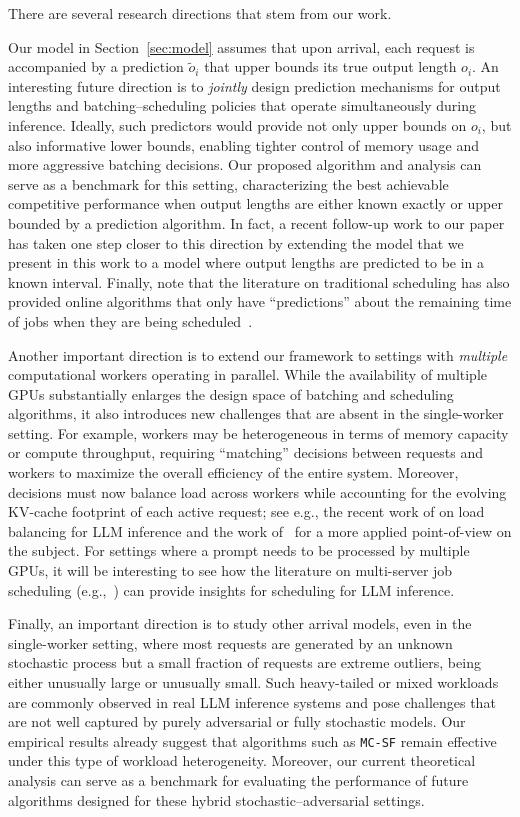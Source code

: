 \documentclass[11pt, a4paper]{article}
\theoremstyle{plain}
\theoremstyle{definition}
\theoremstyle{remark}
\newcommand{\mcsdf}{\texttt{MC-SF}}
\begin{document}
There are several research directions that stem from our work. 

{Our model in Section~\ref{sec:model} assumes that upon arrival, each request is accompanied by a prediction $\tilde{o}_i$ that upper bounds its true output length $o_i$. An interesting future direction is to \emph{jointly} design prediction mechanisms for output lengths and batching–scheduling policies that operate simultaneously during inference. Ideally, such predictors would provide not only upper bounds on $o_i$, but also informative lower bounds, enabling tighter control of memory usage and more aggressive batching decisions. Our proposed algorithm and analysis can serve as a benchmark for this setting, characterizing the best achievable competitive performance when output lengths are either known exactly or upper bounded by a prediction algorithm. In fact, a recent follow-up work to our paper~\citep{chen2025adaptively} has taken one step closer to this direction by extending the model that we present in this work to a model where output lengths are predicted to be in a known interval. Finally, note that the literature on traditional scheduling has also provided online algorithms that only have ``predictions'' about the remaining time of jobs when they are being scheduled~\citep{azar2021flow,azar2022distortion,gupta2026optimal}.}


{Another important direction is to extend our framework to settings with \emph{multiple} computational workers operating in parallel. While the availability of multiple GPUs substantially enlarges the design space of batching and scheduling algorithms, it also introduces new challenges that are absent in the single-worker setting. For example, workers may be heterogeneous in terms of memory capacity or compute throughput, requiring ``matching'' decisions between requests and workers to maximize the overall efficiency of the entire system. Moreover, decisions must now balance load across workers while accounting for the evolving KV-cache footprint of each active request; see e.g., the recent work of \citet{balseiro2025load} on load balancing for LLM inference and the work of~\citet{jaiswal2025sageserve} for a more applied point-of-view on the subject. For settings where a prompt needs to be processed by multiple GPUs, it will be interesting to see how the literature on multi-server job scheduling (e.g.,~\citep{grosof2022optimal}) can provide insights for scheduling for LLM inference.}

{Finally, an important direction is to study other arrival models, even in the single-worker setting, where most requests are generated by an unknown stochastic process but a small fraction of requests are extreme outliers, being either unusually large or unusually small. Such heavy-tailed or mixed workloads are commonly observed in real LLM inference systems and pose challenges that are not well captured by purely adversarial or fully stochastic models. Our empirical results already suggest that algorithms such as \mcsdf{} remain effective under this type of workload heterogeneity. Moreover, our current theoretical analysis can serve as a benchmark for evaluating the performance of future algorithms designed for these hybrid stochastic–adversarial settings.} 
\end{document}
